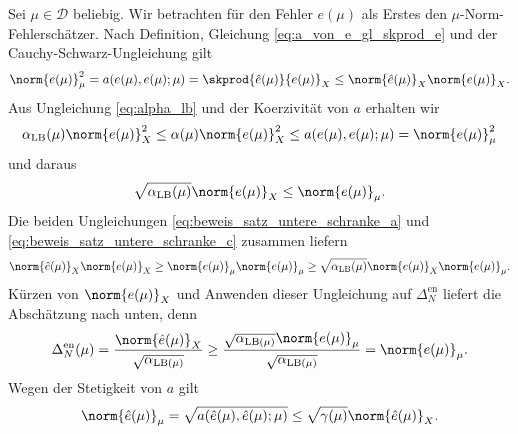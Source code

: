 \begin{Satz}
    \begin{Beweis}
        Sei $\mu \in \mathcal D$ beliebig.
        Wir betrachten für den Fehler $e(\mu)$ als Erstes den $\mu$-Norm-Fehlerschätzer.
        Nach Definition, Gleichung \eqref{eq:a_von_e_gl_skprod_e} und der Cauchy-Schwarz-Ungleichung gilt
        \begin{equation}
            \label{eq:beweis_satz_untere_schranke_a}
            \norm{e(\mu)}_{\mu}^2 = a(e(\mu), e(\mu); \mu) = \skprod{\hat e(\mu)}{e(\mu)}_X \leq \norm{\hat e(\mu)}_X \norm{e(\mu)}_X.
        \end{equation}
        Aus Ungleichung \eqref{eq:alpha_lb} und der Koerzivität von $a$ erhalten wir
        \begin{equation}
            \label{eq:beweis_satz_untere_schranke_b}
            \alpha_{\text{LB}}(\mu) \norm{e(\mu)}^2_X \leq \alpha(\mu) \norm{e(\mu)}^2_X \leq a(e(\mu), e(\mu); \mu) = \norm{e(\mu)}^2_{\mu}
        \end{equation}
        und daraus
        \begin{equation}
            \label{eq:beweis_satz_untere_schranke_c}
            \sqrt{\alpha_{\text{LB}}(\mu)} \norm{e(\mu)}_X \leq \norm{e(\mu)}_{\mu}.
        \end{equation}
        Die beiden Ungleichungen \eqref{eq:beweis_satz_untere_schranke_a} und \eqref{eq:beweis_satz_untere_schranke_c} zusammen liefern
        \begin{equation}
            \norm{\hat e(\mu)}_X \norm{e(\mu)}_X \geq \norm{e(\mu)}_{\mu} \norm{e(\mu)}_{\mu} \geq \sqrt{\alpha_{\text{LB}}(\mu)} \norm{e(\mu)}_X \norm{e(\mu)}_{\mu}.
        \end{equation}
        Kürzen von $\norm{e(\mu)}_X$ und Anwenden dieser Ungleichung auf $\Delta^\text{en}_N$ liefert die Abschätzung nach unten, denn
        \begin{equation}
            \Delta^{\text{en}}_N(\mu)
            =
            \frac{\norm{\hat e(\mu)}_X}{\sqrt{\alpha_{\text{LB}(\mu)}}}
            \geq
            \frac{\sqrt{\alpha_{\text{LB}(\mu)}}\norm{e(\mu)}_{\mu}}{\sqrt{\alpha_{\text{LB}(\mu)}}}
            =
            \norm{e(\mu)}_{\mu}.
        \end{equation}
        Wegen der Stetigkeit von $a$ gilt
        \begin{equation}
            \label{eq:beweis_satz_obere_schranke_a}
            \norm{\hat e(\mu)}_{\mu} = \sqrt{a(\hat e(\mu), \hat e(\mu); \mu)} \leq \sqrt{\gamma(\mu)}\norm{\hat e(\mu)}_X.
        \end{equation}

\end{Beweis}
\end{Satz}
